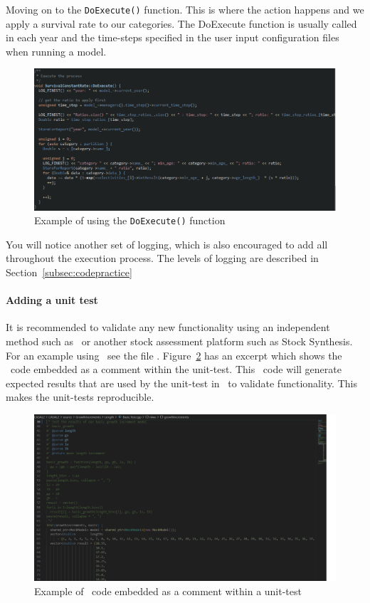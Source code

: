 Moving on to the \texttt{DoExecute()} function. This is where the action happens and we apply a survival rate to our categories. The DoExecute function is usually called in each year and the time-steps specified in the user input configuration files when running a model.

\begin{figure}[H]
	\centering
	\includegraphics[scale=0.5]{Figures/execute.png}
	\caption{Example of using the \texttt{DoExecute()} function}\label{fig:execute}
\end{figure}

You will notice another set of logging, which is also encouraged to add all throughout the execution process. The levels of logging are described in Section~\ref{subsec:codepractice}

\paragraph*{Adding a unit test}

It is recommended to validate any new functionality using an independent method such as \R\ or another stock assessment platform such as Stock Synthesis. For an example using \R\ see the file . Figure~\ref{fig:unittest1} has an excerpt which shows the \R\ code embedded as a comment within the unit-test. This \R\ code will generate expected results that are used by the unit-test in \CNAME\ to validate functionality. This makes the unit-tests reproducible.

\begin{figure}[!ht]
	\centering
	\includegraphics[scale=0.38]{Figures/unittestWithR.png}
	\caption{Example of \R\ code embedded as a comment within a unit-test}\label{fig:unittest1}
\end{figure}


